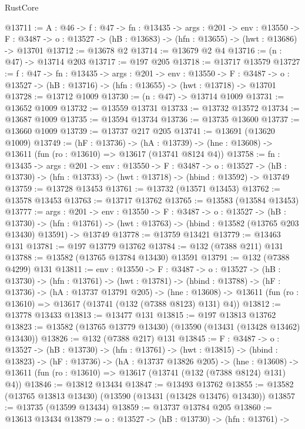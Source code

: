 \begin{lexlean}{RustCore}
\begin{coremodule}
@13711 := {A : @46} ->
  {f : @47} ->
  {fn : @13435} ->
  {args : @201} ->
  {env : @13550} ->
  {F : @3487} -> {o : @13527} -> (hB : @13683) -> (hfn : @13655) -> (hwt : @13686) -> @13701
@13712 := @13678 @2
@13714 := @13679 @2 @4
@13716 := (n : @47) -> @13714 @203
@13717 := @197 @205
@13718 := @13717 @13579
@13727 := {f : @47} ->
  {fn : @13435} ->
  {args : @201} ->
  {env : @13550} ->
  {F : @3487} -> {o : @13527} -> (hB : @13716) -> (hfn : @13655) -> (hwt : @13718) -> @13701
@13728 := @13712 @1009
@13730 := (n : @47) -> @13714 @1009
@13731 := @13652 @1009
@13732 := @13559 @13731
@13733 := @13732 @13572
@13734 := @13687 @1009
@13735 := @13594 @13734
@13736 := @13735 @13600
@13737 := @13660 @1009
@13739 := @13737 @217 @205
@13741 := @13691 (@13620 @1009)
@13749 := (hF : @13736) ->
  (hA : @13739) -> (hne : @13608) -> @13611 (fun (ro : @13610) => @13617 (@13741 @8124 @4))
@13758 := {fn : @13435} ->
  {args : @201} ->
  {env : @13550} ->
  {F : @3487} ->
  {o : @13527} -> (hB : @13730) -> (hfn : @13733) -> (hwt : @13718) -> (hbind : @13592) -> @13749
@13759 := @13728 @13453
@13761 := @13732 (@13571 @13453)
@13762 := @13578 @13453
@13763 := @13717 @13762
@13765 := @13583 (@13584 @13453)
@13777 := {args : @201} ->
  {env : @13550} ->
  {F : @3487} ->
  {o : @13527} ->
  (hB : @13730) ->
  (hfn : @13761) -> (hwt : @13763) -> (hbind : @13582 (@13765 @203 @13430) @13591) -> @13749
@13778 := @13759 @13421
@13779 := @13463 @131
@13781 := @197 @13779 @13762
@13784 := @132 (@7388 @211) @131
@13788 := @13582 (@13765 @13784 @13430) @13591
@13791 := @132 (@7388 @4299) @131
@13811 := {env : @13550} ->
  {F : @3487} ->
  {o : @13527} ->
  (hB : @13730) ->
  (hfn : @13761) ->
  (hwt : @13781) ->
  (hbind : @13788) ->
  (hF : @13736) ->
  (hA : @13737 @13791 @205) ->
  (hne : @13608) -> @13611 (fun (ro : @13610) => @13617 (@13741 (@132 (@7388 @8123) @131) @4))
@13812 := @13778 @13433
@13813 := @13477 @131
@13815 := @197 @13813 @13762
@13823 := @13582 (@13765 @13779 @13430) (@13590 (@13431 (@13428 @13462) @13430))
@13826 := @132 (@7388 @217) @131
@13845 := {F : @3487} ->
  {o : @13527} ->
  (hB : @13730) ->
  (hfn : @13761) ->
  (hwt : @13815) ->
  (hbind : @13823) ->
  (hF : @13736) ->
  (hA : @13737 @13826 @205) ->
  (hne : @13608) -> @13611 (fun (ro : @13610) => @13617 (@13741 (@132 (@7388 @8124) @131) @4))
@13846 := @13812 @13434
@13847 := @13493 @13762
@13855 := @13582 (@13765 @13813 @13430) (@13590 (@13431 (@13428 @13476) @13430))
@13857 := @13735 (@13599 @13434)
@13859 := @13737 @13784 @205
@13860 := @13613 @13434
@13879 := {o : @13527} ->
  (hB : @13730) ->
  (hfn : @13761) ->

\end{coremodule}
\end{lexlean}
